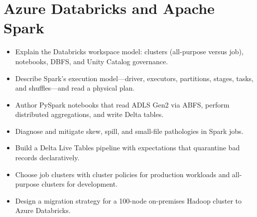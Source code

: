 \chapter{Azure Databricks and Apache Spark}
%
\begin{objectives}
\begin{itemize}
    \item Explain the Databricks workspace model: clusters (all-purpose versus job), notebooks, DBFS, and Unity Catalog governance.
    \item Describe Spark's execution model---driver, executors, partitions, stages, tasks, and shuffles---and read a physical plan.
    \item Author PySpark notebooks that read ADLS Gen2 via ABFS, perform distributed aggregations, and write Delta tables.
    \item Diagnose and mitigate skew, spill, and small-file pathologies in Spark jobs.
    \item Build a Delta Live Tables pipeline with expectations that quarantine bad records declaratively.
    \item Choose job clusters with cluster policies for production workloads and all-purpose clusters for development.
    \item Design a migration strategy for a 100-node on-premises Hadoop cluster to Azure Databricks.
\end{itemize}
\end{objectives}

